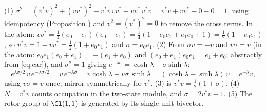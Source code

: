 (1) $\sigma^2 = (v^*v)^2 + (vv^*)^2 - v^*v\,vv^* - vv^*\,v^*v = v^*v + vv^* - 0 - 0 = 1$, using idempotency (Proposition ) and $v^2 = (v^*)^2 = 0$ to remove the cross terms. In the atom: $v v^* = \tfrac14(e_0 + e_1)(e_0 - e_1) = \tfrac14(1 - e_0e_1 + e_1e_0 + 1) = \tfrac12(1 - e_0e_1)$, so $v^*v = 1 - vv^* = \tfrac12(1 + e_0e_1)$ and $\sigma = e_0 e_1$. (2) From $\sigma v = -v$ and $v\sigma = v$ (in the atom: $e_0e_1(e_0 + e_1) = -(e_1 + e_0)$ and $(e_0+e_1)e_0e_1 = e_1 + e_0$; abstractly from \eqref{eq:car}), and $\sigma^2 = 1$ giving $e^{-\lambda\sigma} = \cosh\lambda - \sigma\sinh\lambda$:
\[
e^{\lambda\sigma/2}\,v\,e^{-\lambda\sigma/2} = v\,e^{-\lambda\sigma} = v\cosh\lambda - v\sigma\,\sinh\lambda = (\cosh\lambda - \sinh\lambda)\,v = e^{-\lambda}v ,
\]
using $v\sigma = v$ once; mirror-symmetrically for $v^*$. (3) is $v^*v = \tfrac12(1 + \sigma)$. (4) $N = v^*v$ counts occupation in the two-state module, and $\sigma = 2v^*v - 1$. (5) The rotor group of $\Cl(1,1)$ is generated by its single unit bivector.
